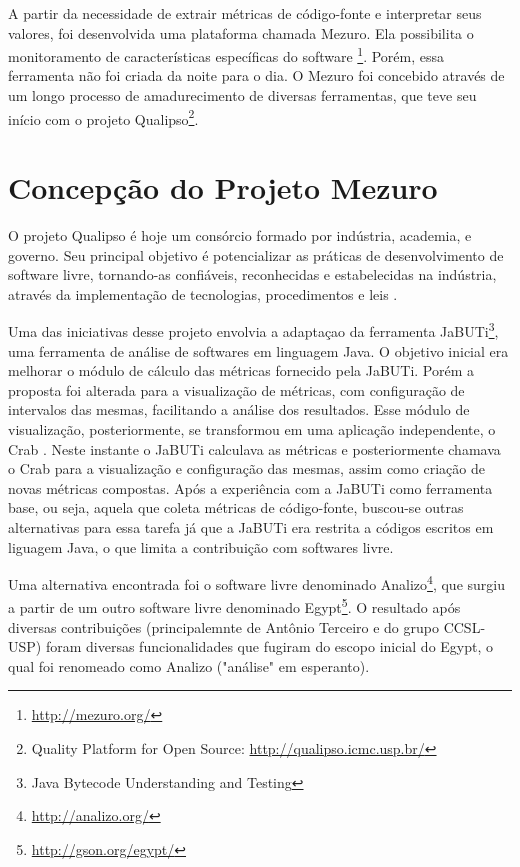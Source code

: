 A partir da necessidade de extrair métricas de código-fonte e interpretar seus valores, foi desenvolvida uma plataforma chamada Mezuro. Ela possibilita o monitoramento de características específicas do software \footnote{\url{http://mezuro.org/}}. Porém, essa ferramenta não foi criada da noite para o dia. O Mezuro foi concebido através de um longo processo de amadurecimento de diversas ferramentas, que teve seu início com o projeto Qualipso\footnote{Quality Platform for Open Source: \url{http://qualipso.icmc.usp.br/}}.

\section{Concepção do Projeto Mezuro}

O projeto Qualipso é hoje um consórcio formado por indústria, academia, e governo. Seu principal objetivo é potencializar as práticas de desenvolvimento de software livre, tornando-as confiáveis, reconhecidas e estabelecidas na indústria, através da implementação de tecnologias, procedimentos e leis \cite{qualipso2009}. 
	
Uma das iniciativas desse projeto envolvia  a adaptaçao da ferramenta JaBUTi\footnote{Java Bytecode Understanding and Testing}, uma ferramenta de análise de softwares em linguagem Java. O objetivo inicial era melhorar o módulo de cálculo das métricas fornecido pela JaBUTi. Porém a proposta foi alterada para a visualização de métricas, com configuração de intervalos das mesmas, facilitando a análise dos resultados. Esse módulo de visualização, posteriormente, se transformou em uma aplicação independente, o Crab \cite{meirelles2009crab}. Neste instante o JaBUTi calculava as métricas e posteriormente chamava o Crab para a visualização e configuração das mesmas,  assim como criação de novas métricas compostas. Após a experiência com a JaBUTi como ferramenta base, ou seja, aquela que coleta métricas de código-fonte, buscou-se outras alternativas para essa tarefa já que a JaBUTi era restrita a códigos escritos  em liguagem Java, o que limita a contribuição com softwares livre.

Uma alternativa encontrada foi o software livre denominado Analizo\footnote{\url{http://analizo.org/}}, que surgiu a partir de um outro software livre denominado Egypt\footnote{\url{http://gson.org/egypt/}}. O resultado após diversas contribuições (principalemnte de Antônio Terceiro e do grupo CCSL-USP) foram diversas funcionalidades que fugiram do escopo inicial do Egypt, o qual foi renomeado como Analizo ("análise" em esperanto). %

